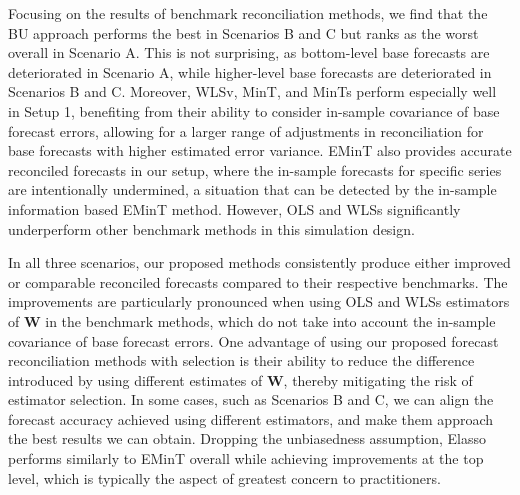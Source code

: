 \documentclass[
  11pt]{article}
\theoremstyle{plain}
\theoremstyle{remark}
\begin{document}
Focusing on the results of benchmark reconciliation methods, we find
that the BU approach performs the best in Scenarios B and C but ranks as
the worst overall in Scenario A. This is not surprising, as bottom-level
base forecasts are deteriorated in Scenario A, while higher-level base
forecasts are deteriorated in Scenarios B and C. Moreover, WLSv, MinT,
and MinTs perform especially well in Setup 1, benefiting from their
ability to consider in-sample covariance of base forecast errors,
allowing for a larger range of adjustments in reconciliation for base
forecasts with higher estimated error variance. EMinT also provides
accurate reconciled forecasts in our setup, where the in-sample
forecasts for specific series are intentionally undermined, a situation
that can be detected by the in-sample information based EMinT method.
However, OLS and WLSs significantly underperform other benchmark methods
in this simulation design.

In all three scenarios, our proposed methods consistently produce either
improved or comparable reconciled forecasts compared to their respective
benchmarks. The improvements are particularly pronounced when using OLS
and WLSs estimators of \(\bm{W}\) in the benchmark methods, which do not
take into account the in-sample covariance of base forecast errors. One
advantage of using our proposed forecast reconciliation methods with
selection is their ability to reduce the difference introduced by using
different estimates of \(\bm{W}\), thereby mitigating the risk of
estimator selection. In some cases, such as Scenarios B and C, we can
align the forecast accuracy achieved using different estimators, and
make them approach the best results we can obtain. Dropping the
unbiasedness assumption, Elasso performs similarly to EMinT overall
while achieving improvements at the top level, which is typically the
aspect of greatest concern to practitioners.
\end{document}
